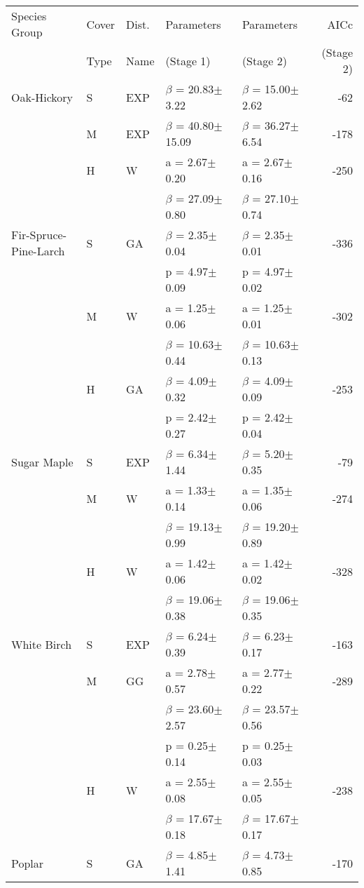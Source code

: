 \documentclass{standalone}
\begin{document}
\begin{table}
{\footnotesize
\begin{tabular}{lllllr}
\toprule
Species Group & Cover & Dist. & Parameters & Parameters & AICc \\
& Type & Name & (Stage 1) & (Stage 2) & (Stage 2) \\
\midrule
Oak-Hickory & S & EXP & $\beta$ = 20.83$\pm$3.22 & $\beta$ = 15.00$\pm$2.62 & -62 \\
 & M & EXP & $\beta$ = 40.80$\pm$15.09 & $\beta$ = 36.27$\pm$6.54 & -178 \\
 & H & W & a = 2.67$\pm$0.20 & a = 2.67$\pm$0.16 & -250 \\
 &  &  & $\beta$ = 27.09$\pm$0.80 & $\beta$ = 27.10$\pm$0.74 &  \\
Fir-Spruce-Pine-Larch & S & GA & $\beta$ = 2.35$\pm$0.04 & $\beta$ = 2.35$\pm$0.01 & -336 \\
 &  &  & p = 4.97$\pm$0.09 & p = 4.97$\pm$0.02 &  \\
 & M & W & a = 1.25$\pm$0.06 & a = 1.25$\pm$0.01 & -302 \\
 &  &  & $\beta$ = 10.63$\pm$0.44 & $\beta$ = 10.63$\pm$0.13 &  \\
 & H & GA & $\beta$ = 4.09$\pm$0.32 & $\beta$ = 4.09$\pm$0.09 & -253 \\
 &  &  & p = 2.42$\pm$0.27 & p = 2.42$\pm$0.04 &  \\
Sugar Maple & S & EXP & $\beta$ = 6.34$\pm$1.44 & $\beta$ = 5.20$\pm$0.35 & -79 \\
 & M & W & a = 1.33$\pm$0.14 & a = 1.35$\pm$0.06 & -274 \\
 &  &  & $\beta$ = 19.13$\pm$0.99 & $\beta$ = 19.20$\pm$0.89 &  \\
 & H & W & a = 1.42$\pm$0.06 & a = 1.42$\pm$0.02 & -328 \\
 &  &  & $\beta$ = 19.06$\pm$0.38 & $\beta$ = 19.06$\pm$0.35 &  \\
White Birch & S & EXP & $\beta$ = 6.24$\pm$0.39 & $\beta$ = 6.23$\pm$0.17 & -163 \\
 & M & GG & a = 2.78$\pm$0.57 & a = 2.77$\pm$0.22 & -289 \\
 &  &  & $\beta$ = 23.60$\pm$2.57 & $\beta$ = 23.57$\pm$0.56 &  \\
 &  &  & p = 0.25$\pm$0.14 & p = 0.25$\pm$0.03 &  \\
 & H & W & a = 2.55$\pm$0.08 & a = 2.55$\pm$0.05 & -238 \\
 &  &  & $\beta$ = 17.67$\pm$0.18 & $\beta$ = 17.67$\pm$0.17 &  \\
Poplar & S & GA & $\beta$ = 4.85$\pm$1.41 & $\beta$ = 4.73$\pm$0.85 & -170 \\

\end{tabular}}
\end{table}
\end{document}

